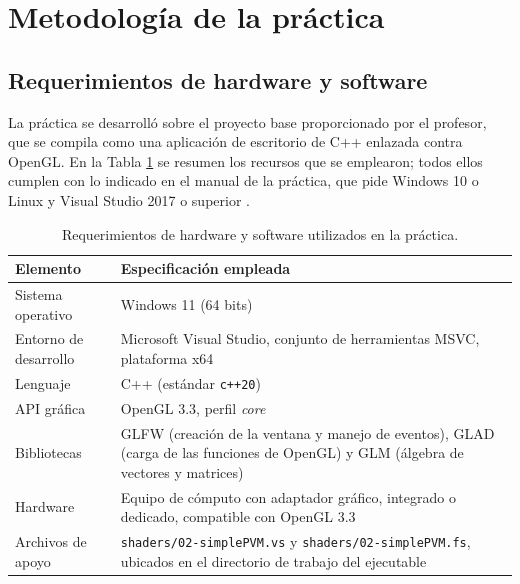 
\section{Metodología de la práctica}

\subsection{Requerimientos de hardware y software}
La práctica se desarrolló sobre el proyecto base proporcionado por el profesor,
que se compila como una aplicación de escritorio de C++ enlazada contra OpenGL.
En la Tabla \ref{tab:requerimientos} se resumen los recursos que se emplearon;
todos ellos cumplen con lo indicado en el manual de la práctica, que pide
Windows 10 o Linux y Visual Studio 2017 o superior \cite{teodoro_manual03}.

\begin{table}[H]
\centering
\begin{tabular}{@{}p{4.0cm}p{10.5cm}@{}}
\toprule
\textbf{Elemento} & \textbf{Especificación empleada} \\
\midrule
Sistema operativo & Windows 11 (64 bits) \\
Entorno de desarrollo & Microsoft Visual Studio, conjunto de herramientas MSVC, plataforma x64 \\
Lenguaje & C++ (estándar \texttt{c++20}) \\
API gráfica & OpenGL 3.3, perfil \textit{core} \\
Bibliotecas & GLFW (creación de la ventana y manejo de eventos), GLAD (carga de las funciones de OpenGL) y GLM (álgebra de vectores y matrices) \\
Hardware & Equipo de cómputo con adaptador gráfico, integrado o dedicado, compatible con OpenGL 3.3 \\
Archivos de apoyo & \texttt{shaders/02-simplePVM.vs} y \texttt{shaders/02-simplePVM.fs}, ubicados en el directorio de trabajo del ejecutable \\
\bottomrule
\end{tabular}
\caption{Requerimientos de hardware y software utilizados en la práctica.}
\label{tab:requerimientos}
\end{table}

